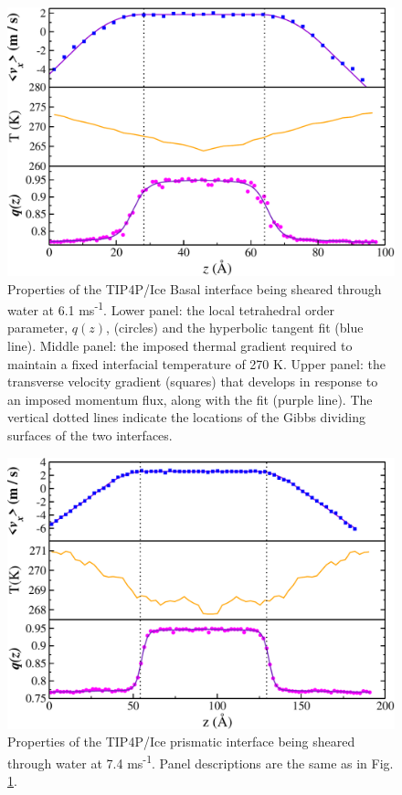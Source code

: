 \begin{figure}
\includegraphics[width=\linewidth]{Figures/Basal_TIP4PIce_Plot}
\caption{\label{fig:tipbComic} Properties of the TIP4P/Ice Basal
  interface being sheared through water at 6.1
  ms\textsuperscript{-1}. Lower panel: the local tetrahedral order
  parameter, $q(z)$, (circles) and the hyperbolic tangent fit
  (blue line).  Middle panel: the imposed thermal gradient
  required to maintain a fixed interfacial temperature of 270 K. Upper
  panel: the transverse velocity gradient (squares) that develops in
  response to an imposed momentum flux, along with the fit (purple
  line). The vertical dotted lines indicate the locations of the Gibbs
  dividing surfaces of the two interfaces.}
\end{figure}

\begin{figure}
\includegraphics[width=\linewidth]{Figures/Prism_TIP4PIce_Plot}
\caption{\label{fig:tippComic} Properties of the TIP4P/Ice prismatic
  interface being sheared through water at 7.4 ms\textsuperscript{-1}.
  Panel descriptions are the same as in Fig. \ref{fig:tipbComic}.}
\end{figure}

